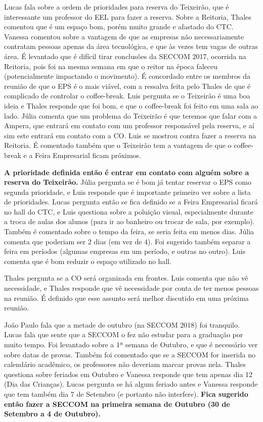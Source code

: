 \documentclass{ata-calico}
\begin{document}
Lucas fala sobre a ordem de prioridades para reserva do Teixeirão, que é
interessante um professor do EEL para fazer a reserva. Sobre a Reitoria, Thales
comentou que é um espaço bom, porém muito grande e afastado do CTC\@. Vanessa
comentou sobre a vantagem de que as empresas não necessariamente contratam
pessoas apenas da área tecnológica, e que às vezes tem vagas de outras área. É
levantado que é difícil tirar conclusões da SECCOM 2017, ocorrida na Reitoria,
pois foi na mesma semana em que o reitor na época faleceu (potencialmente
impactando o movimento). É concordado entre os membros da reunião de que o EPS
é o mais viável, com a ressalva feita pelo Thales de que é complicado de
controlar o coffee-break. Luis pergunta se o Teixeirão é uma boa ideia e Thales
responde que foi bom, e que o coffee-break foi feito em uma sala ao lado. Júlia
comenta que um problema do Teixeirão é que teremos que falar com a Ampera, que
entrará em contato com um professor responsável pela reserva, e aí sim este
entrará em contato com a CO\@. Luis se mostrou contra fazer a reserva na
Reitoria. É comentado também que o Teixeirão tem a vantagem de que o
coffee-break e a Feira Empresarial ficam próximos.

\textbf{A prioridade definida então é entrar em contato com alguém sobre a
reserva do Teixeirão.} Júlia pergunta se é bom já tentar reservar o EPS como
segunda prioridade, e Luis responde que é importante primeiro ver sobre a lista
de prioridades. Lucas pergunta então se fica definido se a Feira Empresarial
ficará no hall do CTC, e Luis questiona sobre a poluição visual, especialmente
durante a troca de aulas dos alunos (para ir ao banheiro ou trocar de sala, por
exemplo). Também é comentado sobre o tempo da feira, se seria feita em menos
dias. Júlia comenta que poderiam ser 2 dias (em vez de 4). Foi sugerido também
separar a feira em períodos (algumas empresas em um período, e outras no
outro). Luis comenta que é bom reduzir o espaço utilizado no hall.


Thales pergunta se a CO será organizada em frontes. Luis comenta que não vê
necessidade, e Thales responde que vê necessidade por conta de ter menos
pessoas na reunião. É definido que esse assunto será melhor discutido em uma
próxima reunião.


João Paulo fala que a metade de outubro (na SECCOM 2018) foi tranquilo. Lucas
fala que sente que a SECCOM o fez não estudar para a graduação por muito tempo.
Foi levantado sobre a 1ª semana de Outubro, e que é necessário ver sobre datas
de provas. Também foi comentado que se a SECCOM for inserida no calendário
acadêmico, os professores não deveriam marcar provas nela. Thales questiona
sobre feriados em Outubro e Vanessa responde que tem apenas dia 12 (Dia das
Crianças). Lucas pergunta se há algum feriado antes e Vanessa responde que tem
também dia 7 de Setembro (e portanto não interfere). \textbf{Fica sugerido
então fazer a SECCOM na primeira semana de Outubro (30 de Setembro a 4 de
Outubro).}
\end{document}
